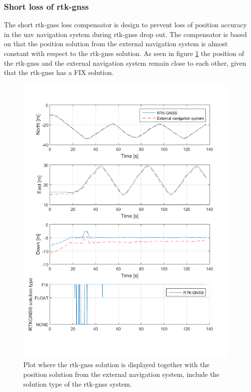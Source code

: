 \subsubsection{Short loss of \gls{rtk-gnss}}\label{ss:ShortLoss}
The short \gls{rtk-gnss} loss compensator is design to prevent loss of position accuracy in the \gls{uav} navigation system during \gls{rtk-gnss} drop out. The compensator is based on that the position solution from the external navigation system is almost constant with respect to the \gls{rtk-gnss} solution. As seen in figure \ref{Fig:RTKExternal} the position of the \gls{rtk-gnss} and the external navigation system remain close to each other, given that the \gls{rtk-gnss} has a FIX solution.
\newpage 
\begin{figure}[H]
\centering
\includegraphics[scale=0.8]{figs/Experiment/RtkExternal.png}
\caption{Plot where the \gls{rtk-gnss} solution is displayed together with the position solution from the external navigation system, include the solution type of the \gls{rtk-gnss} system.}
\label{Fig:RTKExternal}
\end{figure}
